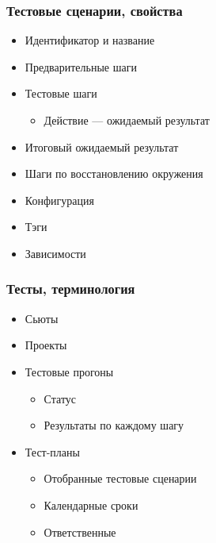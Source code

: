 \documentclass{../../slides-style}
\begin{document}
    \begin{frame}
        \frametitle{Тестовые сценарии, свойства}
        \begin{itemize}
            \item Идентификатор и название
            \item Предварительные шаги
            \item Тестовые шаги
            \begin{itemize}
                \item Действие --- ожидаемый результат
            \end{itemize} 
            \item Итоговый ожидаемый результат
            \item Шаги по восстановлению окружения
            \item Конфигурация
            \item Тэги
            \item Зависимости
        \end{itemize}
    \end{frame}

    \begin{frame}
        \frametitle{Тесты, терминология}
        \begin{itemize}
            \item Сьюты
            \item Проекты
            \item Тестовые прогоны
            \begin{itemize}
                \item Статус
                \item Результаты по каждому шагу
            \end{itemize}
            \item Тест-планы
            \begin{itemize}
                \item Отобранные тестовые сценарии
                \item Календарные сроки
                \item Ответственные
            \end{itemize}
        \end{itemize}
    \end{frame}
\end{document}
